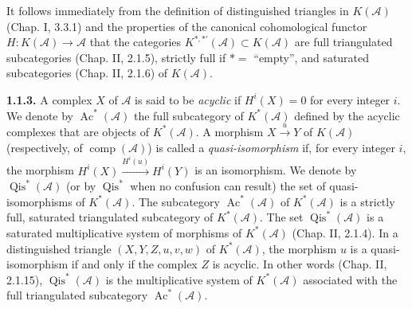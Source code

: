 \clearpage
{}%
\begingroup\small\setlength{\parskip}{0pt}\setlength{\emergencystretch}{1.5em}
\setlength{\abovedisplayskip}{4pt plus 2pt minus 2pt}%
\setlength{\belowdisplayskip}{4pt plus 2pt minus 2pt}%

It follows immediately from the definition of distinguished triangles in
$K(\mathcal A)$ (Chap. I, 3.3.1) and the properties of the canonical
cohomological functor $H\colon K(\mathcal A)\longrightarrow\mathcal A$ that
the categories $K^{*,*'}(\mathcal A)\subset K(\mathcal A)$ are full
triangulated subcategories (Chap. II, 2.1.5), strictly full if $*={}$
``empty'', and saturated subcategories (Chap. II, 2.1.6) of
$K(\mathcal A)$.

\medskip\noindent\textbf{1.1.3.}\quad
A complex $X$ of $\mathcal A$ is said to be \emph{acyclic} if
$H^i(X)=0$ for every integer $i$. We denote by
$\operatorname{Ac}^{*}(\mathcal A)$ the full subcategory of
$K^{*}(\mathcal A)$ defined by the acyclic complexes that are objects of
$K^{*}(\mathcal A)$. A morphism $X\xrightarrow{u}Y$ of $K(\mathcal A)$
(respectively, of $\operatorname{comp}(\mathcal A)$) is called a
\emph{quasi-isomorphism} if, for every integer $i$, the morphism
$H^i(X)\xrightarrow{H^i(u)}H^i(Y)$ is an isomorphism. We denote by
$\operatorname{Qis}^{*}(\mathcal A)$ (or by $\operatorname{Qis}^{*}$ when
no confusion can result) the set of quasi-isomorphisms of
$K^{*}(\mathcal A)$. The subcategory $\operatorname{Ac}^{*}(\mathcal A)$
of $K^{*}(\mathcal A)$ is a strictly full, saturated triangulated
subcategory of $K^{*}(\mathcal A)$. The set
$\operatorname{Qis}^{*}(\mathcal A)$ is a saturated multiplicative system
of morphisms of $K^{*}(\mathcal A)$ (Chap. II, 2.1.4). In a distinguished
triangle $(X,Y,Z,u,v,w)$ of $K^{*}(\mathcal A)$, the morphism $u$ is a
quasi-isomorphism if and only if the complex $Z$ is acyclic. In other words
(Chap. II, 2.1.15), $\operatorname{Qis}^{*}(\mathcal A)$ is the
multiplicative system of $K^{*}(\mathcal A)$ associated with the full
triangulated subcategory $\operatorname{Ac}^{*}(\mathcal A)$.

